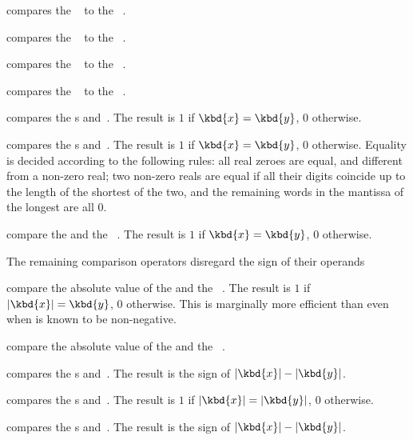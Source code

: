  compares the ~ to the
~.

 compares the ~ to the
~.

 compares the ~ to the
~.

 compares the ~ to the
~.

 compares the s  and~.
The result is $1$ if $\kbd{x} = \kbd{y}$, $0$ otherwise.

 compares the s  and~.
The result is $1$ if $\kbd{x} = \kbd{y}$, $0$ otherwise. Equality is decided
according to the following rules: all real zeroes are equal, and
different from a non-zero real; two non-zero reals are equal if all their
digits coincide up to the length of the shortest of the two, and the
remaining words in the mantissa of the longest are all $0$.


 compare the   and
the ~. The result is $1$ if $\kbd{x} = \kbd{y}$, $0$ otherwise.

The remaining comparison operators disregard the sign of their operands

 compare the absolute value of the
  and the ~. The result is $1$ if
$|\kbd{x}| = \kbd{y}$, $0$ otherwise. This is marginally more efficient
than  even when  is known to be non-negative.


 compare the absolute value of the
  and the ~.



 compares the s  and~.
The result is the sign of $|\kbd{x}| - |\kbd{y}|$.

 compares the s 
and~. The result is $1$ if $|\kbd{x}| = |\kbd{y}|$, $0$ otherwise.

 compares the s  and~.
The result is the sign of $|\kbd{x}| - |\kbd{y}|$.

